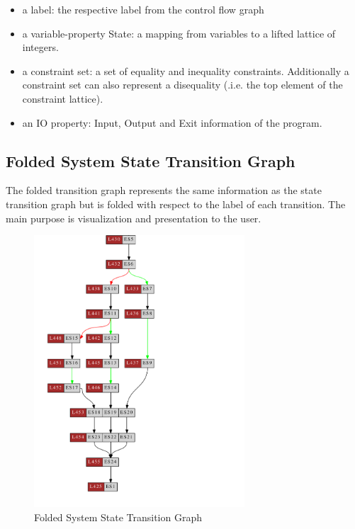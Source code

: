 \begin{itemize}
  \item a label: the respective label from the control flow graph
  \item a variable-property State: a mapping from variables to a
    lifted lattice of integers.
  \item a constraint set: a set of equality and inequality
    constraints. Additionally a constraint set can also represent a
    disequality (.i.e. the top element of the constraint lattice).
  \item an IO property: Input, Output and Exit information of the
    program. 
 \end{itemize}

\subsection{Folded System State Transition Graph}

The folded transition graph represents the same information as the state transition graph but is folded with respect to the label of each transition. The main purpose is visualization and presentation to the user.

\begin{figure}[t]
\centering
\includegraphics[width=0.7\textwidth]{gfx/basictest15_transitiongraph2.pdf}
\caption{Folded System State Transition Graph}
\end{figure}

